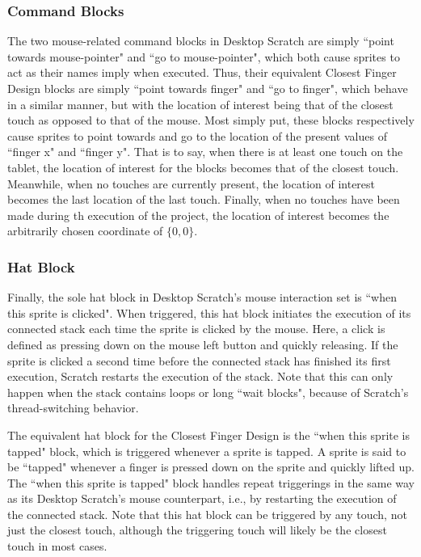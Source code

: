 \subsubsection{Command Blocks}
The two mouse-related command blocks in Desktop Scratch are simply ``point towards mouse-pointer" and ``go to mouse-pointer", which both cause sprites to act as their names imply when executed. Thus, their equivalent Closest Finger Design blocks are simply ``point towards finger" and ``go to finger", which behave in a similar manner, but with the location of interest being that of the closest touch as opposed to that of the mouse. Most simply put, these blocks respectively cause sprites to point towards and go to the location of the present values of ``finger x" and ``finger y". That is to say, when there is at least one touch on the tablet, the location of interest for the blocks becomes that of the closest touch. Meanwhile, when no touches are currently present, the location of interest becomes the last location of the last touch. Finally, when no touches have been made during th execution of the project, the location of interest becomes the arbitrarily chosen coordinate of $\{0,0\}$.

\subsubsection{Hat Block}
Finally, the sole hat block in Desktop Scratch's mouse interaction set is ``when this sprite is clicked". When triggered, this hat block initiates the execution of its connected stack each time the sprite is clicked by the mouse. Here, a click is defined as pressing down on the mouse left button and quickly releasing. If the sprite is clicked a second time before the connected stack has finished its first execution, Scratch restarts the execution of the stack. Note that this can only happen when the stack contains loops or long ``wait blocks",  because of Scratch's thread-switching behavior. 

The equivalent hat block for the Closest Finger Design is the ``when this sprite is tapped" block, which is triggered whenever a sprite is tapped. A sprite is said to be ``tapped" whenever a finger is pressed down on the sprite and quickly lifted up. The ``when this sprite is tapped" block handles repeat triggerings in the same way as its Desktop Scratch's mouse counterpart, i.e., by restarting the execution of the connected stack. Note that this hat block can be triggered by any touch, not just the closest touch, although the triggering touch will likely be the closest touch in most cases.

